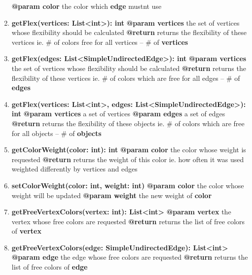 \documentclass{article}
\begin{document}
\begin{enumerate}[\#]
{			\textbf{@param color} the color which \textbf{edge} mustnt use
		}
		\item{
			\textbf{getFlex(vertices: List<int>): int} \newline
			\textbf{@param vertices} the set of vertices whose flexibility should be calculated \newline
			\textbf{@return} returns the flexibility of these vertices ie. \# of colors free for all vertices -- \# of \textbf{vertices}
		}
		\item{
			\textbf{getFlex(edges: List<SimpleUndirectedEdge>): int} \newline
			\textbf{@param vertices} the set of vertices whose flexibility should be calculated \newline
			\textbf{@return} returns the flexibility of these vertices ie. \# of colors which are free for all edges -- \# of \textbf{edges}
		}
		\item{
			\textbf{getFlex(vertices: List<int>, edges: List<SimpleUndirectedEdge>): int} \newline
			\textbf{@param vertices} a set of vertices \newline
			\textbf{@param edges} a set of edges \newline
			\textbf{@return} returns the flexibility of these objects ie. \# of colors which are free for all objects -- \# of \textbf{objects}
		}
		\item{
			\textbf{getColorWeight(color: int): int} \newline
			\textbf{@param color} the color whose weight is requested \newline
			\textbf{@return} returns the weight of this color ie. how often it was used weighted differently by vertices and edges
		}
		\item{
			\textbf{setColorWeight(color: int, weight: int)} \newline
			\textbf{@param color} the color whose weight will be updated \newline
			\textbf{@param weight} the new weight of \textbf{color}
		}
		\item{
			\textbf{getFreeVertexColors(vertex: int): List<int>} \newline
			\textbf{@param vertex} the vertex whose free colors are requested \newline
			\textbf{@return} returns the list of free colors of \textbf{vertex}
		}
		\item{
			\textbf{getFreeVertexColors(edge: SimpleUndirectedEdge): List<int>} \newline
			\textbf{@param edge} the edge whose free colors are requested \newline
			\textbf{@return} returns the list of free colors of \textbf{edge}
		}
	\end{enumerate}
	
\end{document}

